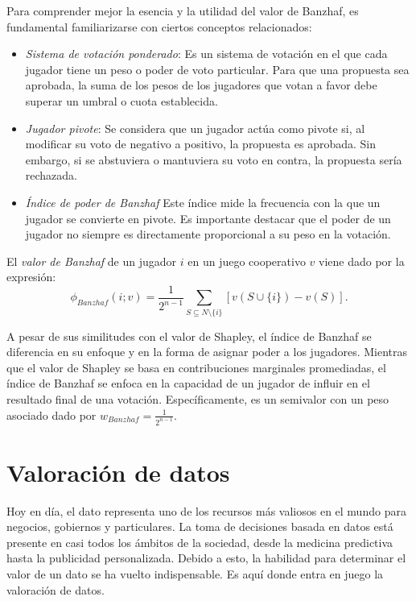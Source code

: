 Para comprender mejor la esencia y la utilidad del valor de
Banzhaf, es fundamental familiarizarse con ciertos conceptos
relacionados:

\begin{itemize}
  \item \emph{Sistema de votación ponderado}: Es un sistema de
  votación en el que cada jugador tiene un peso o poder de voto
  particular. Para que una propuesta sea aprobada, la suma de los
  pesos de los jugadores que votan a favor debe superar un
  umbral o cuota establecida.

  \item \emph{Jugador pivote}: Se considera que un jugador actúa
  como pivote si, al modificar su voto de negativo a positivo,
  la propuesta es aprobada. Sin embargo, si se abstuviera o
  mantuviera su voto en contra, la propuesta sería rechazada.

  \item \emph{Índice de poder de Banzhaf} Este índice mide la
  frecuencia con la que un jugador se convierte en pivote.
  Es importante destacar que el poder de un jugador no siempre
  es directamente proporcional a su peso en la votación.
\end{itemize}

\begin{definition}
  El \emph{valor de Banzhaf} de un jugador $i$ en un juego
  cooperativo $v$ viene dado por la expresión:
  \begin{equation}
    \label{ec:banzhafFormula}
    \phi_{Banzhaf}(i;v) = \frac{1}{2^{n-1}} \sum_{S
    \subseteq N \setminus \{i\}} [v(S \cup \{i\}) - v(S)].
  \end{equation}
\end{definition}

A pesar de sus similitudes con el valor de Shapley, el índice
de Banzhaf se diferencia en su enfoque y en la forma de asignar
poder a los jugadores.
Mientras que el valor de Shapley se basa en contribuciones
marginales promediadas, el índice de Banzhaf se enfoca en la
capacidad de un jugador de influir en el resultado final de
una votación. Específicamente, es un semivalor
con un peso asociado dado por $w_{Banzhaf} = \frac{1}{2^{n-1}}$.

\newpage
\section{Valoración de datos}

Hoy en día, el dato representa uno de los recursos más
valiosos en el mundo para negocios, gobiernos y particulares.
La toma de decisiones basada en datos está presente en
casi todos los ámbitos de la sociedad, desde la medicina
predictiva hasta la publicidad personalizada. Debido a
esto, la habilidad para determinar el valor de un dato
se ha vuelto indispensable. Es aquí donde entra
en juego la valoración de datos.


